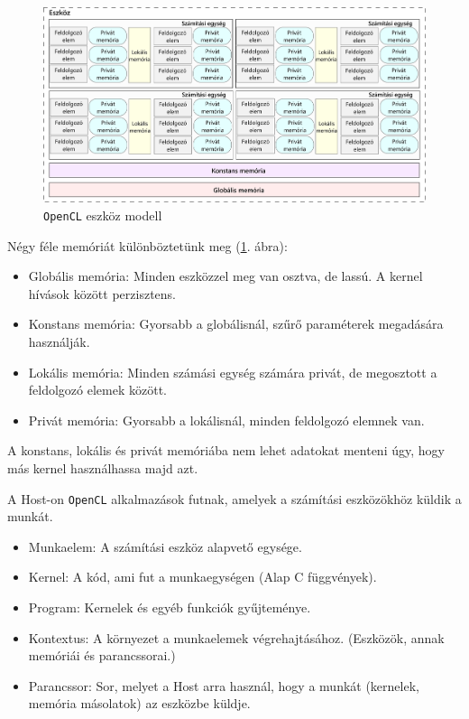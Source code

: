 \begin{figure}[h!]
\centering
\includegraphics[width=\textwidth]{images/device.png}
\caption{\texttt{OpenCL} eszköz modell}
\label{fig:device}
\end{figure}

Négy féle memóriát különböztetünk meg (\ref{fig:device}. ábra):
\begin{itemize}
\item Globális memória: Minden eszközzel meg van osztva, de lassú. A kernel hívások között perzisztens. 
\item Konstans memória: Gyorsabb a globálisnál, szűrő paraméterek megadására használják.
\item Lokális memória: Minden számási egység számára privát, de megosztott a feldolgozó elemek között.
\item Privát memória: Gyorsabb a lokálisnál, minden feldolgozó elemnek van.
\end{itemize} 
A konstans, lokális és privát memóriába nem lehet adatokat menteni úgy, hogy más kernel használhassa majd azt.


A Host-on \texttt{OpenCL} alkalmazások futnak, amelyek a számítási eszközökhöz küldik a munkát.
\begin{itemize}
\item Munkaelem: A számítási eszköz alapvető egysége.
\item Kernel: A kód, ami fut a munkaegységen  (Alap C függvények).
\item Program: Kernelek és egyéb funkciók gyűjteménye.
\item Kontextus: A környezet a munkaelemek végrehajtásához. (Eszközök, annak memóriái és parancssorai.)
\item Parancssor: Sor, melyet a Host arra használ, hogy a munkát (kernelek, memória másolatok) az eszközbe küldje.
\end{itemize}

